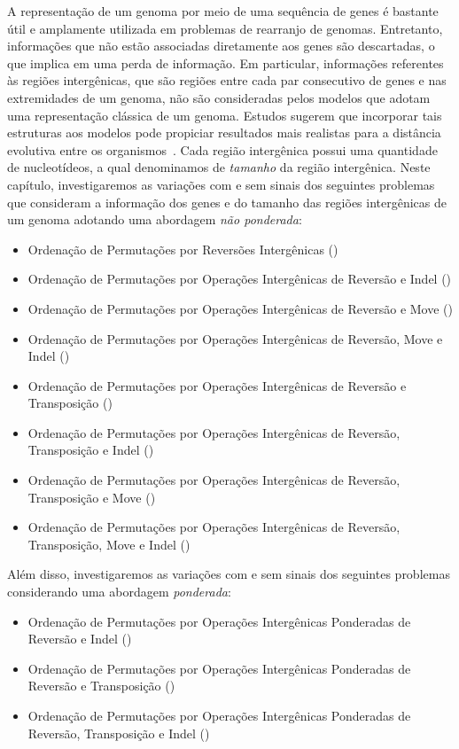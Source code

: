 
A representação de um genoma por meio de uma sequência de genes é bastante útil e amplamente utilizada em problemas de rearranjo de genomas. Entretanto, informações que não estão associadas diretamente aos genes são descartadas, o que implica em uma perda de informação. Em particular, informações referentes às regiões intergênicas, que são regiões entre cada par consecutivo de genes e nas extremidades de um genoma, não são consideradas pelos modelos que adotam uma representação clássica de um genoma. Estudos sugerem que incorporar tais estruturas aos modelos pode propiciar resultados mais realistas para a distância evolutiva entre os organismos~\cite{2016a-biller-etal, 2016b-biller-etal}. Cada região intergênica possui uma quantidade de nucleotídeos, a qual denominamos de \emph{tamanho} da região intergênica. Neste capítulo, investigaremos as variações com e sem sinais dos seguintes problemas que consideram a informação dos genes e do tamanho das regiões intergênicas de um genoma adotando uma abordagem \emph{não ponderada}:

\begin{itemize}
  \item Ordenação de Permutações por Reversões Intergênicas (\SbIR)
  \item Ordenação de Permutações por Operações Intergênicas de Reversão e Indel (\SbIRI)
  \item Ordenação de Permutações por Operações Intergênicas de Reversão e Move \break (\SbIRM)
  \item Ordenação de Permutações por Operações Intergênicas de Reversão, Move e Indel (\SbIRMI)
  \item Ordenação de Permutações por Operações Intergênicas de Reversão e Transposição (\SbIRT)
  \item Ordenação de Permutações por Operações Intergênicas de Reversão, Transposição e Indel (\SbIRTI)
  \item Ordenação de Permutações por Operações Intergênicas de Reversão, Transposição e Move (\SbIRTM)
  \item Ordenação de Permutações por Operações Intergênicas de Reversão, Transposição, Move e Indel (\SbIRTMI)
\end{itemize}

Além disso, investigaremos as variações com e sem sinais dos seguintes problemas considerando uma abordagem \emph{ponderada}:

\begin{itemize}
  \item Ordenação de Permutações por Operações Intergênicas Ponderadas de Reversão e Indel (\SbWIRI)
  \item Ordenação de Permutações por Operações Intergênicas Ponderadas de Reversão e Transposição (\SbWIRT)
  \item Ordenação de Permutações por Operações Intergênicas Ponderadas de Reversão, Transposição e Indel (\SbWIRTI)
\end{itemize}

